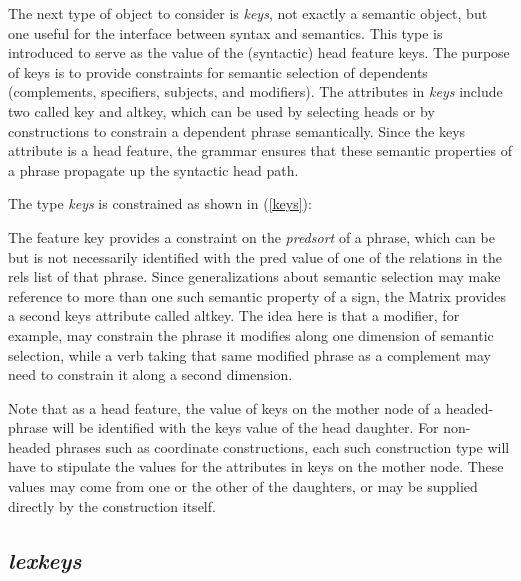 \documentclass[12pt]{article}
\newcommand{\es}{\enumsentence}
\begin{document}
The next type of object to consider is {\it keys}, not exactly a semantic
object, but one useful for the interface between syntax and semantics.
This type is
introduced to serve as the value of the (syntactic) {\sc head} feature
{\sc keys}.
The purpose of {\sc keys} is to provide constraints for semantic
selection of dependents (complements, specifiers, subjects, and
modifiers).  The attributes in {\it keys} include two called {\sc key}
and {\sc altkey}, which can be used by selecting heads or by constructions
to constrain a dependent phrase semantically.
Since the {\sc keys} attribute is a {\sc head} feature,
the grammar ensures that these semantic properties of a phrase
propagate up the syntactic head path.

The type {\it keys} is constrained as shown in (\ref{keys}):

\es{\label{keys}
\begin{avm}
\[ key & predsort \\
   altkey & predsort \]
\end{avm}
}

The feature {\sc key} provides a constraint on the {\it predsort} of a phrase,
which can be but is not necessarily identified with the {\sc pred} value of one
of the relations in the {\sc rels} list of that phrase.  Since generalizations
about semantic selection may make reference to more than one such semantic
property of a sign, the Matrix provides a second {\sc keys} attribute called
{\sc altkey}.  The idea here is that a modifier, for example, may constrain the
phrase it modifies along one dimension of semantic selection, while a verb
taking that same modified phrase as a complement may need to constrain it along
a second dimension.

Note that as a head feature, the value of {\sc keys} on the mother node of a
headed-phrase will be identified with the {\sc keys} value of the head
daughter.  For non-headed phrases such as coordinate constructions, each
such construction type will have to stipulate the values for the attributes
in {\sc keys} on the mother node.  These values may come from one or the other
of the daughters, or may be supplied directly by the construction itself.


\subsection{{\it lexkeys}}
\label{lexkeysec}
\end{document}

